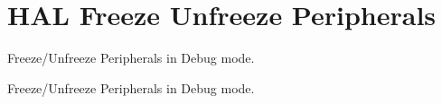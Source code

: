 \hypertarget{group___h_a_l___freeze___unfreeze___peripherals}{}\section{H\+AL Freeze Unfreeze Peripherals}
\label{group___h_a_l___freeze___unfreeze___peripherals}


Freeze/\+Unfreeze Peripherals in Debug mode.  


Freeze/\+Unfreeze Peripherals in Debug mode. 

